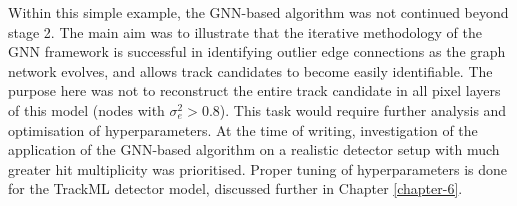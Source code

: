 Within this simple example, the GNN-based algorithm was not continued beyond stage 2. The main aim was to illustrate that the iterative methodology of the GNN framework is successful in identifying outlier edge connections as the graph network evolves, and allows track candidates to become easily identifiable. The purpose here was not to reconstruct the entire track candidate in all pixel layers of this model (nodes with $\sigma_e^2 > 0.8$). This task would require further analysis and optimisation of hyperparameters. At the time of writing, investigation of the application of the GNN-based algorithm on a realistic detector setup with much greater hit multiplicity was prioritised. Proper tuning of hyperparameters is done for the TrackML detector model, discussed further in Chapter \ref{chapter-6}. 


